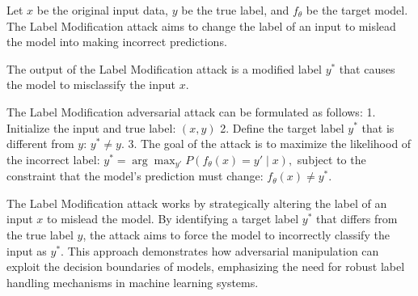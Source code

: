 Let \( x \) be the original input data, \( y \) be the true label, and \( f_{\theta} \) be the target model. The Label Modification attack aims to change the label of an input to mislead the model into making incorrect predictions.

The output of the Label Modification attack is a modified label \( y^* \) that causes the model to misclassify the input \( x \).

The Label Modification adversarial attack can be formulated as follows:
1. Initialize the input and true label:
   $
   (x, y)
   $
2. Define the target label \( y^* \) that is different from \( y \):
   $
   y^* \neq y.
   $
3. The goal of the attack is to maximize the likelihood of the incorrect label:
   $
   y^* = \arg\max_{y'} P(f_{\theta}(x) = y' \mid x),
   $
   subject to the constraint that the model's prediction must change:
   $
   f_{\theta}(x) \neq y^*.
   $

The Label Modification attack works by strategically altering the label of an input \( x \) to mislead the model. By identifying a target label \( y^* \) that differs from the true label \( y \), the attack aims to force the model to incorrectly classify the input as \( y^* \). This approach demonstrates how adversarial manipulation can exploit the decision boundaries of models, emphasizing the need for robust label handling mechanisms in machine learning systems.
